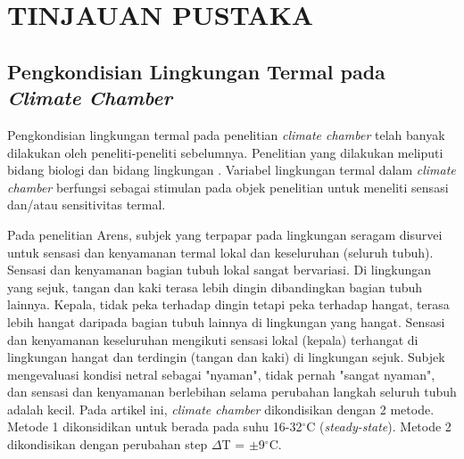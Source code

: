 \chapter{TINJAUAN PUSTAKA}
\label{pustaka}

\section{Pengkondisian Lingkungan Termal pada \textit{Climate Chamber}}

Pengkondisian lingkungan termal pada penelitian \textit{climate chamber} telah banyak dilakukan oleh peneliti-peneliti sebelumnya. Penelitian yang dilakukan meliputi bidang biologi \cite{paper21Arens} \cite{paper21JYLee} dan bidang lingkungan \cite{paper21Veronica}. Variabel lingkungan termal dalam \textit{climate chamber} berfungsi sebagai stimulan pada objek penelitian untuk meneliti sensasi dan/atau sensitivitas termal.

Pada penelitian Arens\cite{paper21Arens}, subjek yang terpapar pada lingkungan seragam disurvei untuk sensasi dan kenyamanan termal lokal dan keseluruhan (seluruh tubuh). Sensasi dan kenyamanan bagian tubuh lokal sangat bervariasi. Di lingkungan yang sejuk, tangan dan kaki terasa lebih dingin dibandingkan bagian tubuh lainnya. Kepala, tidak peka terhadap dingin tetapi peka terhadap hangat, terasa lebih hangat daripada bagian tubuh lainnya di lingkungan yang hangat. Sensasi dan kenyamanan keseluruhan mengikuti sensasi lokal (kepala) terhangat di lingkungan hangat dan terdingin (tangan dan kaki) di lingkungan sejuk. Subjek mengevaluasi kondisi netral sebagai "nyaman", tidak pernah "sangat nyaman", dan sensasi dan kenyamanan berlebihan selama perubahan langkah seluruh tubuh adalah kecil. Pada artikel ini, \textit{climate chamber} dikondisikan dengan 2 metode. Metode 1 dikonsidikan untuk berada pada suhu 16-32$^\circ$C (\textit{steady-state}). Metode 2 dikondisikan dengan perubahan step $\Delta$T = $\pm$9$^\circ$C.

